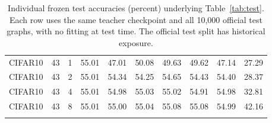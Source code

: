 \begin{table}[p]
\begin{tabular}{llrrrrrrrr}
\addlinespace[2pt]
CIFAR10 & 43 & 1 & 55.01 & 47.01 & 50.08 & 49.63 & 49.62 & 47.14 & 27.29 \\
CIFAR10 & 43 & 2 & 55.01 & 54.34 & 54.25 & 54.65 & 54.43 & 54.40 & 28.37 \\
CIFAR10 & 43 & 4 & 55.01 & 54.98 & 55.03 & 55.02 & 54.91 & 54.98 & 32.81 \\
CIFAR10 & 43 & 8 & 55.01 & 55.00 & 55.04 & 55.08 & 55.08 & 54.99 & 42.16 \\
\addlinespace[2pt]
\bottomrule\end{tabular}
\caption{Individual frozen test accuracies (percent) underlying Table~\ref{tab:test}. Each row uses the same teacher checkpoint and all 10,000 official test graphs, with no fitting at test time. The official test split has historical exposure.}\label{tab:individual}\end{table}
